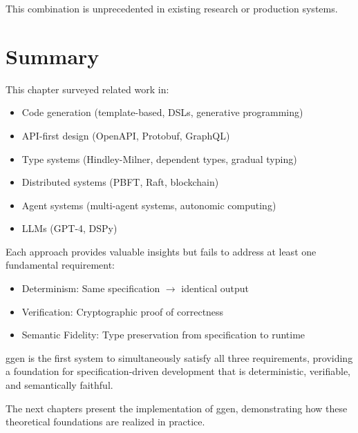 This combination is unprecedented in existing research or production systems.

\section{Summary}

This chapter surveyed related work in:
\begin{itemize}
    \item Code generation (template-based, DSLs, generative programming)
    \item API-first design (OpenAPI, Protobuf, GraphQL)
    \item Type systems (Hindley-Milner, dependent types, gradual typing)
    \item Distributed systems (PBFT, Raft, blockchain)
    \item Agent systems (multi-agent systems, autonomic computing)
    \item LLMs (GPT-4, DSPy)
\end{itemize}

Each approach provides valuable insights but fails to address at least one fundamental requirement:
\begin{itemize}
    \item Determinism: Same specification $\rightarrow$ identical output
    \item Verification: Cryptographic proof of correctness
    \item Semantic Fidelity: Type preservation from specification to runtime
\end{itemize}

ggen is the first system to simultaneously satisfy all three requirements, providing a foundation for specification-driven development that is deterministic, verifiable, and semantically faithful.

The next chapters present the implementation of ggen, demonstrating how these theoretical foundations are realized in practice.
